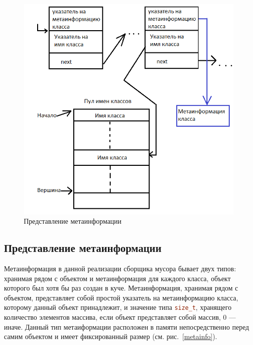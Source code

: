 \begin{figure}[t]
	\centering
	\includegraphics[width=0.9\linewidth]{Berezun/images/picture2.png}
	\caption{Представление метаинформации}
        \label{metarepr}
\end{figure}

\subsection{Представление метаинформации}
Метаинформация в данной реализации сборщика мусора бывает двух типов: хранимая рядом с объектом и метаинформация для каждого класса, объект которого был хотя бы раз создан в куче.
Метаинформация, хранимая рядом с объектом, представляет собой простой указатель на метаинформацию класса,
которому данный объект принадлежит, и значение типа \lstinline[language= cpp]{size_t},
хранящего количество элементов массива, если объект представляет собой массив, 0 --- иначе.
Данный тип метаиформации расположен в памяти непосредственно перед самим объектом и имеет фиксированный размер (см. рис.~\ref{metainfo}).

